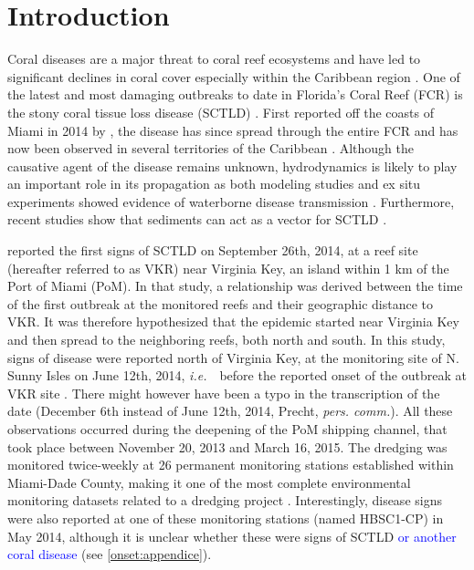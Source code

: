 \documentclass[preprint,12pt,authoryear]{elsarticle}
\newcommand{\ie}{{\it i.e.}\ }
\newcommand{\modif}[1]{\textcolor{blue}{#1}}
\begin{document}
\linenumbers

\section{Introduction}

Coral diseases are a major threat to coral reef ecosystems and have led to significant declines in coral cover especially within the Caribbean region \citep{richardson1998coral, sutherland2004disease, aronson2001white, harvell2007coral, brandt2009dynamics}. One of the latest and most damaging outbreaks to date in Florida's Coral Reef (FCR) is the stony coral tissue loss disease (SCTLD) \citep{noaa2018}. First reported off the coasts of Miami in 2014 by \cite{precht2016unprecedented}, the disease has since spread through the entire FCR \citep{muller2020spatial,dobbelaere2022connecting} and has now been observed in several territories of the Caribbean \citep{kramer2019map, meiling2021variable, estrada2021effects,heres2021ecological}. Although the causative agent of the disease remains unknown, hydrodynamics is likely to play an important role in its propagation as both modeling studies and ex situ experiments showed evidence of waterborne disease transmission \citep{aeby2019pathogenesis,dobbelaere2020coupled,eaton2021measuring, meiling2021variable}. Furthermore, recent studies show that sediments can act as  a vector for SCTLD \citep{rosales2020rhodobacterales, studivan2022reef}.

\cite{precht2016unprecedented} reported the first signs of SCTLD on September 26th, 2014, at a reef site (hereafter referred to as VKR) near Virginia Key, an island within 1 km of the Port of Miami (PoM). In that study, a relationship was derived between the time of the first outbreak at the monitored reefs and their geographic distance to VKR. It was therefore hypothesized that the epidemic started near Virginia Key and then spread to the neighboring reefs, both north and south. In this study, signs of disease were reported north of Virginia Key, at the monitoring site of N. Sunny Isles on June 12th, 2014, \ie~before the reported onset of the outbreak at VKR site \citep{precht2016unprecedented}. There might however have been a typo in the transcription of the date (December 6th instead of June 12th, 2014, Precht, \textit{pers. comm.}). All these observations occurred during the deepening of the PoM shipping channel, that took place between November 20, 2013 and March 16, 2015. The dredging was monitored twice-weekly at 26 permanent monitoring stations established within Miami-Dade County, making it one of the most complete environmental monitoring datasets related to a dredging project \citep{gintert2019regional}. Interestingly, disease signs were also reported at one of these monitoring stations (named HBSC1-CP) in May 2014, although it is unclear whether these were signs of SCTLD \modif{or another coral disease} (see \ref{onset:appendice}).
\end{document}
